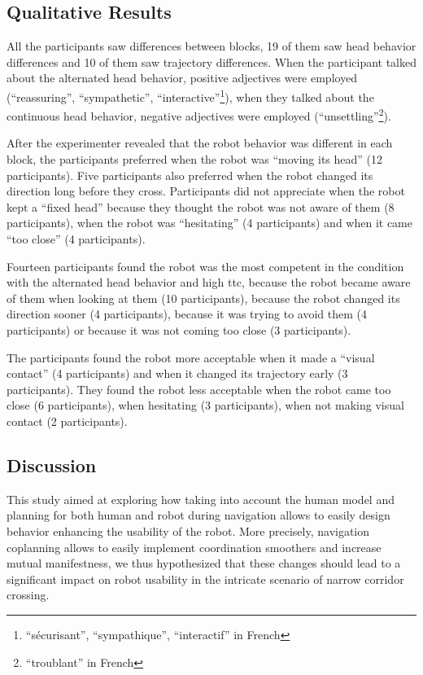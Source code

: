 \documentclass[a4paper,11pt,twoside]{StyleThese}
\begin{document}
\subsection{Qualitative Results}
All the participants saw differences between blocks, 19 of them saw head behavior differences and 10 of them saw trajectory differences. When the participant talked about the alternated head behavior, positive adjectives were employed (``reassuring'', ``sympathetic'', ``interactive''\footnote{``sécurisant'', ``sympathique'', ``interactif'' in French}), when they talked about the continuous head behavior, negative adjectives were employed (``unsettling''\footnote{``troublant'' in French}).

After the experimenter revealed that the robot behavior was different in each block, the participants preferred when the robot was ``moving its head'' (12 participants). Five participants also preferred when the robot changed its direction long before they cross. Participants did not appreciate when the robot kept a ``fixed head'' because they thought the robot was not aware of them (8 participants), when the robot was ``hesitating'' (4 participants) and when it came ``too close'' (4 participants).

Fourteen participants found the robot was the most competent in the condition with the alternated head behavior and high \acrshort{ttc}, because the robot became aware of them when looking at them (10 participants), because the robot changed its direction sooner (4 participants), because it was trying to avoid them (4 participants) or because it was not coming too close (3 participants).

The participants found the robot more acceptable when it made a ``visual contact'' (4 participants) and when it changed its trajectory early (3 participants). They found the robot less acceptable when the robot came too close (6 participants), when hesitating (3 participants), when not making visual contact (2 participants).


\subsection{Discussion}
This study aimed at exploring how taking into account the human model and planning for both human and robot during navigation allows to easily design behavior enhancing the usability of the robot. More precisely, navigation coplanning allows to easily implement coordination smoothers and increase mutual manifestness, we thus hypothesized that these changes should lead to a significant impact on robot usability in the intricate scenario of narrow corridor crossing.
\end{document}
